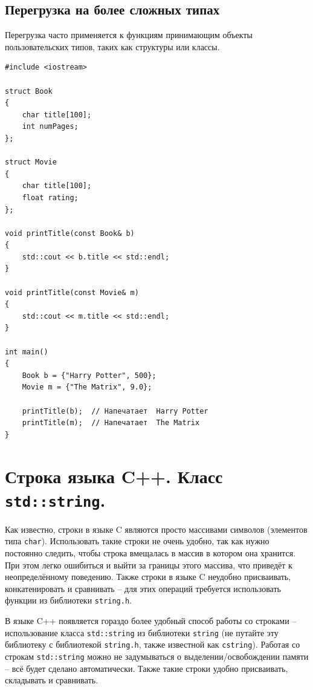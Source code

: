 \documentclass{article}
\begin{document}
\subsection*{Перегрузка на более сложных типах}
Перегрузка часто применяется к функциям принимающим объекты пользовательских типов, таких как структуры или классы.
\begin{lstlisting}
#include <iostream>

struct Book
{
    char title[100];
    int numPages;
};

struct Movie
{
    char title[100];
    float rating;
};

void printTitle(const Book& b)
{
    std::cout << b.title << std::endl;
}

void printTitle(const Movie& m)
{
    std::cout << m.title << std::endl;
}

int main()
{
    Book b = {"Harry Potter", 500};
    Movie m = {"The Matrix", 9.0};
    
    printTitle(b);  // Напечатает  Harry Potter
    printTitle(m);  // Напечатает  The Matrix
}
\end{lstlisting}


\newpage
\section*{Строка языка C++. Класс \texttt{std::string}.}

Как известно, строки в языке C являются просто массивами символов (элементов типа \texttt{char}). Использовать такие строки не очень удобно, так как нужно постоянно следить, чтобы строка вмещалась в массив в котором она хранится. При этом легко ошибиться и выйти за границы этого массива, что приведёт к неопределённому поведению. Также строки в языке C неудобно присваивать, конкатенировать и сравнивать -- для этих операций требуется использовать функции из библиотеки \texttt{string.h}.

В языке C++ появляется гораздо более удобный способ работы со строками -- использование класса \texttt{std::string} из библиотеки \texttt{string} (не путайте эту библиотеку с библиотекой \texttt{string.h}, также известной как \texttt{cstring}). Работая со строкам \texttt{std::string} можно не задумываться о выделении/освобождении памяти -- всё будет сделано автоматически. Также такие строки удобно присваивать, складывать и сравнивать.
\end{document}
